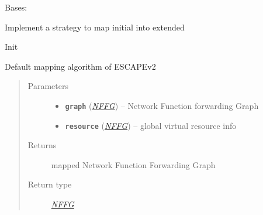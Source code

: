 \documentclass[letterpaper,10pt,english]{sphinxmanual}
\begin{document}
\begin{fulllineitems}
\label{orchest/ros_mapping:escape.orchest.ros_mapping.ESCAPEMappingStrategy}
Bases: {\hyperref[util/mapping:escape.util.mapping.AbstractMappingStrategy]{\emph{}}}

Implement a strategy to map initial {\hyperref[util/nffg:escape.util.nffg.NFFG]{\emph{}}}
into extended {\hyperref[util/nffg:escape.util.nffg.NFFG]{\emph{}}}

\begin{fulllineitems}
\label{orchest/ros_mapping:escape.orchest.ros_mapping.ESCAPEMappingStrategy.__init__}
Init

\end{fulllineitems}


\begin{fulllineitems}
\label{orchest/ros_mapping:escape.orchest.ros_mapping.ESCAPEMappingStrategy.map}
Default mapping algorithm of ESCAPEv2
\begin{quote}\begin{description}
\item[{Parameters}] \leavevmode\begin{itemize}
\item {} 
\textbf{\texttt{graph}} ({\hyperref[util/nffg:escape.util.nffg.NFFG]{\emph{\emph{NFFG}}}}) -- Network Function forwarding Graph

\item {} 
\textbf{\texttt{resource}} ({\hyperref[util/nffg:escape.util.nffg.NFFG]{\emph{\emph{NFFG}}}}) -- global virtual resource info

\end{itemize}

\item[{Returns}] \leavevmode
mapped Network Function Forwarding Graph

\item[{Return type}] \leavevmode
{\hyperref[util/nffg:escape.util.nffg.NFFG]{\emph{NFFG}}}

\end{description}\end{quote}

\end{fulllineitems}


\end{fulllineitems}
\end{document}
